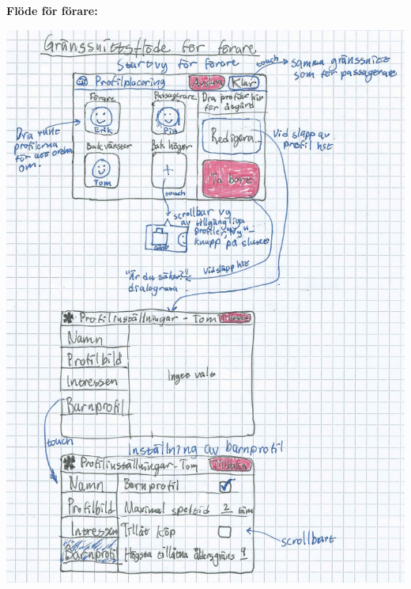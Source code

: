\documentclass[a4paper,12pt,titlepage]{article}
\begin{document}
\newpage
\textbf{Flöde för förare:}
\begin{center}
\includegraphics[width=14cm]{images/driverflow.jpg}
\end{center}
\end{document}
